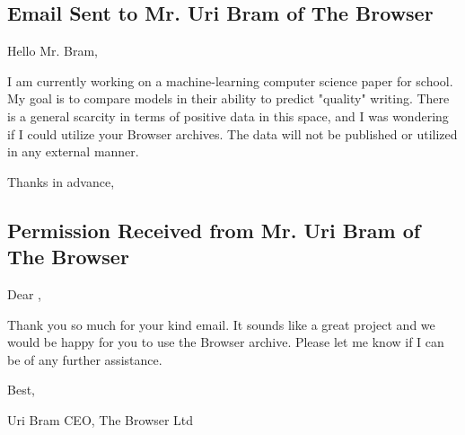 \subsection{Email Sent to Mr. Uri Bram of The Browser}

Hello Mr. Bram,

I am currently working on a machine-learning computer science paper for school. My goal is to compare models in their ability to predict "quality" writing. There is a general scarcity in terms of positive data in this space, and I was wondering if I could utilize your Browser archives. The data will not be published or utilized in any external manner. 

Thanks in advance, \\

\subsection{Permission Received from Mr. Uri Bram of The Browser}

Dear ,

Thank you so much for your kind email. It sounds like a great project and we would be happy for you to use the Browser archive. Please let me know if I can be of any further assistance.

Best,

Uri Bram
CEO, The Browser Ltd